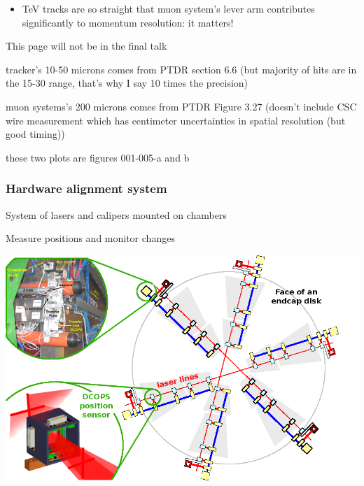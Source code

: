 \documentclass[compress]{beamer}
\begin{document}
\begin{frame}
\begin{itemize}
{\begin{center}
\begin{minipage}{0.7\linewidth}
\begin{columns}
\end{columns}
\end{minipage}
\end{center}}

\item<2> TeV tracks are so straight that muon system's lever arm
contributes significantly to momentum resolution: it matters!
\end{itemize}
\end{frame}

\begin{notes}
\item This page will not be in the final talk
\item tracker's 10-50 microns comes from PTDR section 6.6 (but
majority of hits are in the 15-30 range, that's why I say 10 times the
precision)
\item muon systems's 200 microns comes from PTDR Figure 3.27 (doesn't
include CSC wire measurement which has centimeter uncertainties in
spatial resolution (but good timing))
\item these two plots are figures 001-005-a and b
\end{notes}

\begin{frame}
\frametitle{Hardware alignment system}

System of lasers and calipers mounted on chambers

\vfill Measure positions and monitor changes

\vfill \includegraphics[width=\linewidth]{hardware_alignment.png}
\end{frame}
\end{document}
